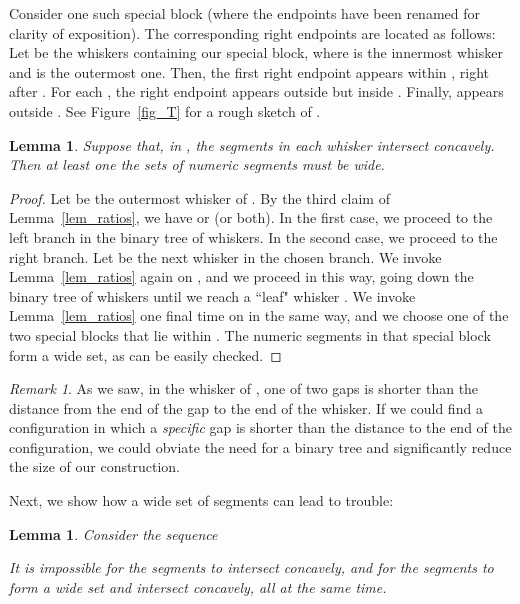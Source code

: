\documentclass[11pt]{article}
\newtheorem{lemma}[theorem]{Lemma}
\theoremstyle{definition}
\theoremstyle{remark}
\newtheorem{remark}[theorem]{Remark}
\begin{document}
Consider one such special block  (where the endpoints have been renamed for clarity of exposition). The corresponding right endpoints are located as follows: Let  be the whiskers containing our special block, where  is the innermost whisker and  is the outermost one. Then, the first right endpoint  appears within , right after . For each , the right endpoint  appears outside  but inside . Finally,  appears outside . See Figure~\ref{fig_T} for a rough sketch of .

\begin{lemma}\label{lemma_one_wide}
Suppose that, in , the segments  in each whisker intersect concavely. Then at least one the sets of  numeric segments must be wide.
\end{lemma}

\begin{proof}
Let  be the outermost whisker of . By the third claim of Lemma~\ref{lem_ratios}, we have  or  (or both). In the first case, we proceed to the left branch in the binary tree of whiskers. In the second case, we proceed to the right branch. Let  be the next whisker in the chosen branch. We invoke Lemma~\ref{lem_ratios} again on , and we proceed in this way, going down the binary tree of whiskers until we reach a ``leaf" whisker . We invoke Lemma~\ref{lem_ratios} one final time on  in the same way, and we choose one of the two special blocks that lie within . The  numeric segments in that special block form a wide set, as can be easily checked.
\end{proof}

\begin{remark}\label{remark_binary_tree}
As we saw, in the whisker  of , one of two gaps is shorter than the distance from the end of the gap to the end of the whisker. If we could find a configuration in which a \emph{specific} gap is shorter than the distance to the end of the configuration, we could obviate the need for a binary tree and significantly reduce the size of our construction.
\end{remark}

Next, we show how a wide set of  segments can lead to trouble:

\begin{lemma}\label{lem_smash_wide}
Consider the sequence

It is impossible for the segments  to intersect concavely, and for the segments  to form a wide set and intersect concavely, all at the same time.
\end{lemma}
\end{document}
